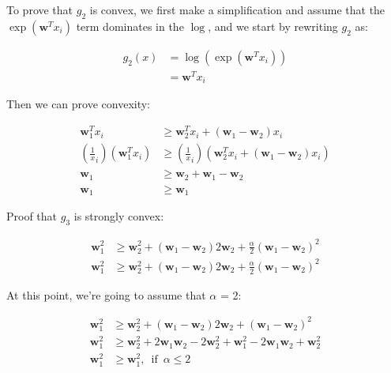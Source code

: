 \documentclass{article}
\begin{document}
To prove that $g_2$ is convex, we first make a simplification and assume that the $\exp( \mathbf{w}^T x_i)$ term dominates in the $\log$, and we start by rewriting $g_2$ as:

\begin{equation}
\begin{aligned}
g_2(x) &= \log( \exp( \mathbf{w}^T x_i ) ) \\
           &= \mathbf{w}^Tx_i
\end{aligned}
\end{equation}

Then we can prove convexity:

\begin{equation}
\begin{aligned}
\mathbf{w}_1^Tx_i &\geq \mathbf{w}_2^Tx_i + (\mathbf{w}_1 - \mathbf{w}_2) x_i \\
( \frac1x_i )( \mathbf{w}_1^Tx_i ) &\geq ( \frac1x_i ) (\mathbf{w}_2^Tx_i + (\mathbf{w}_1 - \mathbf{w}_2) x_i ) \\
\mathbf{w}_1 &\geq \mathbf{w}_2 + \mathbf{w}_1 - \mathbf{w}_2 \\
\mathbf{w}_1 &\geq \mathbf{w}_1
\end{aligned}
\end{equation}

Proof that $g_3$ is strongly convex:

\begin{equation}
\begin{aligned}
\mathbf{w}_1^2 &\geq \mathbf{w}_2^2 + (\mathbf{w}_1 - \mathbf{w}_2) 2\mathbf{w}_2 + \frac\alpha2 ( \mathbf{w}_1 - \mathbf{w}_2 )^2 \\
\mathbf{w}_1^2 &\geq \mathbf{w}_2^2 + ( \mathbf{w}_1 - \mathbf{w}_2) 2\mathbf{w}_2 + \frac\alpha2 ( \mathbf{w}_1 - \mathbf{w}_2 )^2
\end{aligned}
\end{equation}

At this point, we're going to assume that $\alpha$ = 2:

\begin{equation}
\begin{aligned}
\mathbf{w}_1^2 &\geq \mathbf{w}_2^2 + (\mathbf{w}_1 - \mathbf{w}_2) 2\mathbf{w}_2 + ( \mathbf{w}_1 - \mathbf{w}_2 )^2 \\
\mathbf{w}_1^2 &\geq \mathbf{w}_2^2 + 2\mathbf{w}_1\mathbf{w}_2 - 2\mathbf{w}_2^2 + \mathbf{w}_1^2 - 2\mathbf{w}_1\mathbf{w}_2 + \mathbf{w}_2^2 \\
\mathbf{w}_1^2 &\geq \mathbf{w}_1^2, \enspace \text{if} \enspace \alpha \leq 2
\end{aligned}
\end{equation}
\end{document}
